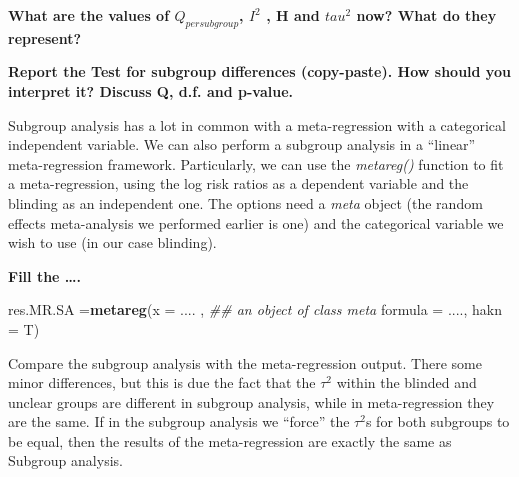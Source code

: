 \documentclass[]{article}
\newenvironment{Shaded}{\begin{snugshade}}{\end{snugshade}}
\newcommand{\CommentTok}[1]{\textcolor[rgb]{0.56,0.35,0.01}{\textit{#1}}}
\newcommand{\DataTypeTok}[1]{\textcolor[rgb]{0.13,0.29,0.53}{#1}}
\newcommand{\KeywordTok}[1]{\textcolor[rgb]{0.13,0.29,0.53}{\textbf{#1}}}
\newcommand{\NormalTok}[1]{#1}
\begin{document}
\textbf{What are the values of \(Q_{per subgroup}\), \(I^2\) , H and
\(tau^2\) now? What do they represent?}

\newline 

\newline 

\newline 

\newline 

\newline 

\textbf{Report the Test for subgroup differences (copy-paste). How
should you interpret it? Discuss Q, d.f. and p-value.}

\newline 

\newline 

\newline 

\newline 

\newline 

\newpage

Subgroup analysis has a lot in common with a meta-regression with a
categorical independent variable. We can also perform a subgroup
analysis in a ``linear'' meta-regression framework. Particularly, we can
use the \emph{metareg()} function to fit a meta-regression, using the
log risk ratios as a dependent variable and the blinding as an
independent one. The options need a \emph{meta} object (the random
effects meta-analysis we performed earlier is one) and the categorical
variable we wish to use (in our case blinding).

\textbf{Fill the \ldots{}.}

\begin{Shaded}
\begin{Highlighting}[]
\NormalTok{res.MR.SA =}\KeywordTok{metareg}\NormalTok{(}\DataTypeTok{x =}\NormalTok{ .... , }\CommentTok{## an object of class meta}
                  \DataTypeTok{formula =}\NormalTok{ ....,}
                  \DataTypeTok{hakn =}\NormalTok{ T)}
\end{Highlighting}
\end{Shaded}

Compare the subgroup analysis with the meta-regression output. There
some minor differences, but this is due the fact that the \(\tau^2\)
within the blinded and unclear groups are different in subgroup
analysis, while in meta-regression they are the same. If in the subgroup
analysis we ``force'' the \(\tau^2\)s for both subgroups to be equal,
then the results of the meta-regression are exactly the same as Subgroup
analysis.
\end{document}
